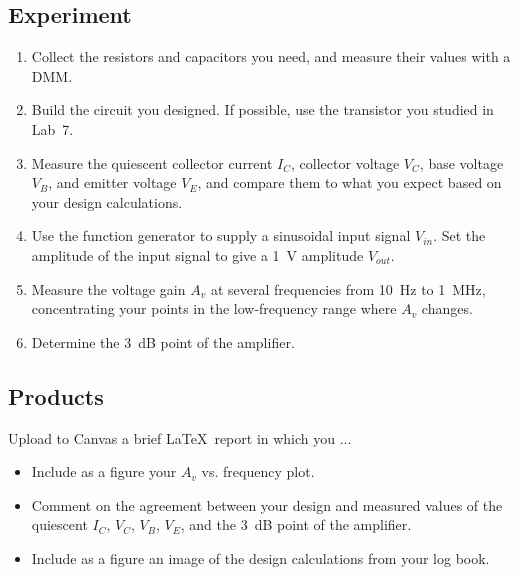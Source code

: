 \documentclass[11pt]{article}
\begin{document}
\subsection*{Experiment}

\begin{enumerate}
\item Collect the resistors and capacitors you need, and measure their
  values with a DMM.
  
\item Build the circuit you designed. If possible, use the transistor
  you studied in Lab~7.

\item Measure the quiescent collector current $I_C$, collector
  voltage $V_C$, base voltage $V_B$, and emitter voltage $V_E$, and
  compare them to what you expect based on your design calculations.
  
\item Use the function generator to supply a sinusoidal input signal
  $V_{in}$. Set the amplitude of the input signal to give a 1~V
  amplitude $V_{out}$.

\item Measure the voltage gain $A_v$ at several frequencies from 10~Hz
  to 1~MHz, concentrating your points in the low-frequency range where
  $A_v$ changes.

\item Determine the 3~dB point of the amplifier.
\end{enumerate}

\subsection*{Products}

Upload to Canvas a brief \LaTeX\ report in which you ...
\begin{itemize}
\item Include as a figure your $A_v$ vs. frequency plot.

\item Comment on the agreement between your design and measured values
  of the quiescent $I_C$, $V_C$, $V_B$, $V_E$, and the 3~dB point
  of the amplifier.

\item Include as a figure an image of the design calculations from
  your log book.
\end{itemize}
\end{document}
